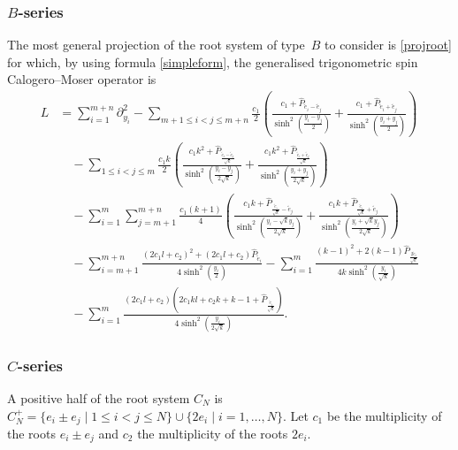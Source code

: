 \documentclass[12pt]{amsart}
\numberwithin{equation}{section}
\theoremstyle{definition}
\begin{document}
\subsubsection{$B$-series}
The most general projection of the root system of type~$B$ to consider is \eqref{projroot} for which, by using formula \eqref{simpleform}, the generalised trigonometric spin Calogero--Moser operator is
\begin{align}
    L &= \sum_{i=1}^{m+n} \partial_{y_i}^2 -  \sum\limits_{m+1 \leq i < j \leq m+n} \frac{c_1}{2} \left( \frac{c_1 + \widehat{P}_{\widetilde{e}_i - \widetilde{e}_j}}{\sinh^2(\frac{y_i - y_j}{2})} + \frac{c_1 + \widehat{P}_{\widetilde{e}_i + \widetilde{e}_j}}{\sinh^2(\frac{y_i + y_j}{2})} \right) \label{trigHamB}
    \\
    &\quad -\sum\limits_{1 \leq i < j \leq m}\frac{c_1 k}{2}  \left( \frac{c_1 k^2 + \widehat{P}_{\frac{\widetilde{e}_i - \widetilde{e}_j}{\sqrt{k}}}}{\sinh^2(\frac{y_i - y_j}{2\sqrt{k}})} + \frac{c_1 k^2 + \widehat{P}_{\frac{\widetilde{e}_i + \widetilde{e}_j}{\sqrt{k}}}}{\sinh^2(\frac{y_i + y_j}{2\sqrt{k}})} \right) 
    \nonumber \\
    &\quad - \sum\limits_{i = 1}^m \sum\limits_{j = m+1}^{m+n} \frac{c_1(k+1)}{4}\left( \frac{c_1 k +  \widehat{P}_{\frac{\widetilde{e}_i}{\sqrt{k}}-\widetilde{e}_j}}{\sinh^2(\frac{y_i-\sqrt{k}y_j}{2\sqrt{k}})} + \frac{c_1 k + \widehat{P}_{\frac{\widetilde{e}_i}{\sqrt{k}}+\widetilde{e}_j}}{\sinh^2(\frac{y_i + \sqrt{k}y_j}{2\sqrt{k}})} \right) 
    \nonumber \\
    &\quad -\sum\limits_{i = m+1}^{m+n} \frac{(2c_1 l + c_2)^2 + (2 c_1 l + c_2)\widehat{P}_{\widetilde{e}_i}}{4\sinh^2(\frac{y_i}{2})} 
    - \sum\limits_{i = 1}^m \frac{(k-1)^2 + 2(k-1) \widehat{P}_{\frac{2 \widetilde{e}_i}{\sqrt{k}}}}{4k\sinh^2(\frac{y_i}{\sqrt{k}})} 
    \nonumber \\
    &\quad -\sum\limits_{i = 1}^m \frac{(2 c_1 l + c_2)\left(2 c_1 kl +  c_2 k + k-1 + \widehat{P}_{\frac{\widetilde{e}_i}{\sqrt{k}}}\right)}{4\sinh^2(\frac{y_i}{2\sqrt{k}})}. \nonumber
\end{align}


\subsubsection{$C$-series}
A positive half of the root system $C_N$ is $C_N^+ = \{ e_i \pm e_j \mid 1 \leq i < j \leq N\} \cup \{ 2e_i  \mid i= 1, \dots, N\}$.
Let $c_1$ be the multiplicity of the roots $e_i \pm e_j$ and $c_2$ the multiplicity of the roots $2e_i$.
\end{document}

